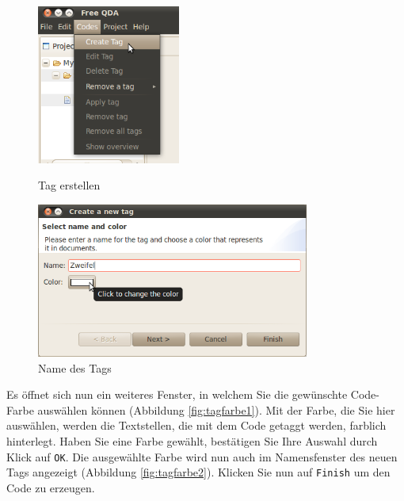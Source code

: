 \begin{figure}[!hb]
\begin{minipage}[!hb!]{0.5\textwidth}
	\centering
	 \includegraphics[width=0.42\textwidth]{img/createtag1}
	\caption{Tag erstellen}
	\label{fig:newtag1}
\end{minipage}
\hfill
\begin{minipage}[!hb!]{0.5\textwidth}
	\centering
	 \includegraphics[width=0.8\textwidth]{img/tagname}
	\caption{Name des Tags}
	\label{fig:tagname}
\end{minipage}
\end{figure}

Es öffnet sich nun ein weiteres Fenster, in welchem Sie die gewünschte Code-Farbe auswählen können (Abbildung \ref{fig:tagfarbe1}). %
Mit der Farbe, die Sie hier auswählen, werden die Textstellen, die mit dem Code getaggt werden, farblich hinterlegt. Haben Sie eine Farbe %
gewählt, bestätigen Sie Ihre Auswahl durch Klick auf \texttt{OK}. Die ausgewählte Farbe wird nun auch im Namensfenster des neuen Tags %
angezeigt (Abbildung \ref{fig:tagfarbe2}). Klicken Sie nun auf \texttt{Finish} um den Code zu erzeugen.

